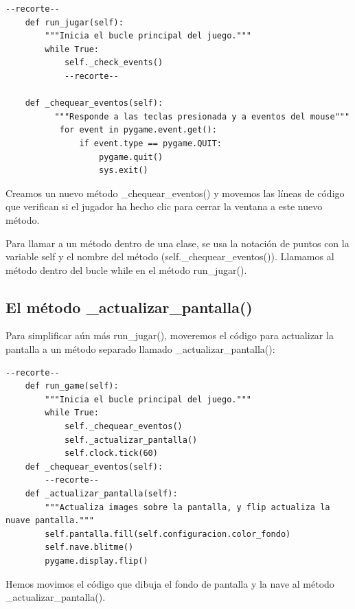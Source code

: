 \vspace{-0.2cm}
\hspace{-2.1cm}{\ttfamily \scriptsize \_alien.py}\vspace{-0.84cm}
\begin{lstlisting}
--recorte--	
    def run_jugar(self):
        """Inicia el bucle principal del juego."""
        while True:
            self._check_events()
            --recorte--
        
    def _chequear_eventos(self):
          """Responde a las teclas presionada y a eventos del mouse"""
           for event in pygame.event.get():
               if event.type == pygame.QUIT:
                   pygame.quit()
                   sys.exit()	
\end{lstlisting}

Creamos un nuevo método {\ttfamily \_chequear\_eventos()} y movemos las líneas de código  que verifican
si el jugador ha hecho clic para cerrar la ventana a este nuevo método.

Para llamar a un método dentro de una clase, se usa la notación de puntos con la variable
{\ttfamily self} y el nombre del método ({\ttfamily self.\_chequear\_eventos()}). Llamamos al método dentro del bucle while en el método {\ttfamily run\_jugar()}.

\subsection{El método \_actualizar\_pantalla()}  


Para simplificar aún más {\ttfamily run\_jugar()}, moveremos el código para actualizar la pantalla
a un método separado llamado  {\ttfamily\_actualizar\_pantalla()}:


\begin{lstlisting}
--recorte--		
    def run_game(self):
        """Inicia el bucle principal del juego."""
        while True:
            self._chequear_eventos()
            self._actualizar_pantalla()
            self.clock.tick(60)
    def _chequear_eventos(self):
        --recorte--
    def _actualizar_pantalla(self):
        """Actualiza images sobre la pantalla, y flip actualiza la nuave pantalla."""
        self.pantalla.fill(self.configuracion.color_fondo)
        self.nave.blitme()
        pygame.display.flip()	

\end{lstlisting}	

Hemos movimos el código que dibuja el fondo de pantalla y la nave al método {\ttfamily\_actualizar\_pantalla()}. 


